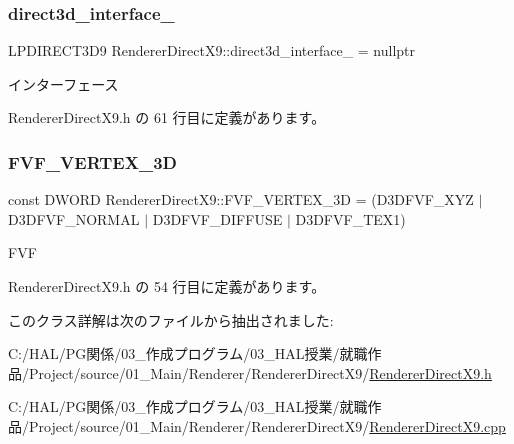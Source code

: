 \subsubsection{\texorpdfstring{direct3d\+\_\+interface\+\_\+}{direct3d\_interface\_}}
{\footnotesize\ttfamily L\+P\+D\+I\+R\+E\+C\+T3\+D9 Renderer\+Direct\+X9\+::direct3d\+\_\+interface\+\_\+ = nullptr\hspace{0.3cm}{\ttfamily [private]}}



インターフェース 



 Renderer\+Direct\+X9.\+h の 61 行目に定義があります。

\mbox{\label{class_renderer_direct_x9_a80ce0089b01354986332553353625da6}} 
\subsubsection{\texorpdfstring{F\+V\+F\+\_\+\+V\+E\+R\+T\+E\+X\+\_\+3D}{FVF\_VERTEX\_3D}}
{\footnotesize\ttfamily const D\+W\+O\+RD Renderer\+Direct\+X9\+::\+F\+V\+F\+\_\+\+V\+E\+R\+T\+E\+X\+\_\+3D = (D3\+D\+F\+V\+F\+\_\+\+X\+YZ $\vert$ D3\+D\+F\+V\+F\+\_\+\+N\+O\+R\+M\+AL $\vert$ D3\+D\+F\+V\+F\+\_\+\+D\+I\+F\+F\+U\+SE $\vert$ D3\+D\+F\+V\+F\+\_\+\+T\+E\+X1)\hspace{0.3cm}{\ttfamily [static]}}



F\+VF 



 Renderer\+Direct\+X9.\+h の 54 行目に定義があります。



このクラス詳解は次のファイルから抽出されました\+:\begin{DoxyCompactItemize}
\item 
C\+:/\+H\+A\+L/\+P\+G関係/03\+\_\+作成プログラム/03\+\_\+\+H\+A\+L授業/就職作品/\+Project/source/01\+\_\+\+Main/\+Renderer/\+Renderer\+Direct\+X9/\mbox{\hyperlink{_renderer_direct_x9_8h}{Renderer\+Direct\+X9.\+h}}\item 
C\+:/\+H\+A\+L/\+P\+G関係/03\+\_\+作成プログラム/03\+\_\+\+H\+A\+L授業/就職作品/\+Project/source/01\+\_\+\+Main/\+Renderer/\+Renderer\+Direct\+X9/\mbox{\hyperlink{_renderer_direct_x9_8cpp}{Renderer\+Direct\+X9.\+cpp}}\end{DoxyCompactItemize}
